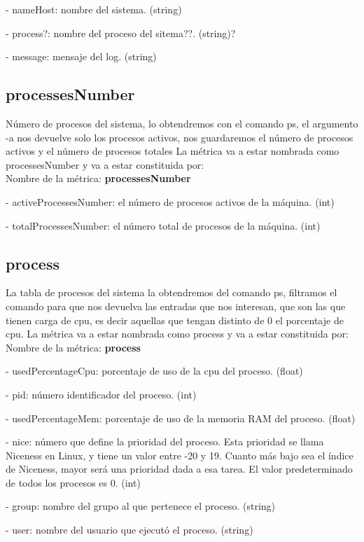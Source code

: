 \documentclass[ spanish, a4paper, 12pt, oneside]{report}
\begin{document}
\hyp{} nameHost: nombre del sistema. (string)

\hyp{} process?: nombre del proceso del sitema??. (string)?

\hyp{} message: mensaje del log. (string)

\subsection{processesNumber}
Número de procesos del sistema, lo obtendremos con el comando ps, el argumento -a nos devuelve solo los 
procesos activos, nos guardaremos el número de procesos activos y el número de procesos totales
La métrica va a estar nombrada como processesNumber y va a estar constituida por:\\
 
Nombre de la métrica: \textbf{processesNumber}
 
\hyp{} activeProcessesNumber: el número de procesos activos de la máquina. (int)
 
\hyp{} totalProcessesNumber: el número total de procesos de la máquina. (int)

\subsection{process}
La tabla de procesos del sistema la obtendremos del comando ps, filtramos el comando para que nos devuelva 
las entradas que nos interesan, que son las que tienen carga de cpu, es decir aquellas que tengan distinto de 0 el porcentaje de cpu.
La métrica va a estar nombrada como process y va a estar constituida por:\\
  
Nombre de la métrica: \textbf{process}
  
\hyp{} usedPercentageCpu: porcentaje de uso de la cpu del proceso. (float)

\hyp{} pid: número identificador del proceso. (int)
  
\hyp{} usedPercentageMem: porcentaje de uso de la memoria RAM del proceso. (float)
  
\hyp{} nice: número que define la prioridad del proceso. Esta prioridad se llama Niceness en Linux, 
y tiene un valor entre -20 y 19. Cuanto más bajo sea el índice de Niceness, mayor será una prioridad dada a esa tarea.
El valor predeterminado de todos los procesos es 0. (int)

\hyp{} group: nombre del grupo al que pertenece el proceso. (string)

\hyp{} user: nombre del usuario que ejecutó el proceso. (string)
\end{document}
